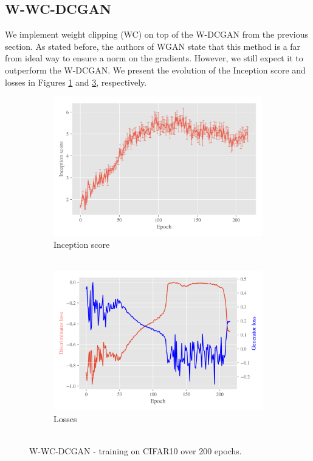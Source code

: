 \subsection{W-WC-DCGAN}
\label{sec:exp-w-wc-dcgan}
We implement weight clipping (WC) on top of the W-DCGAN from the previous section. As stated before, the authors of WGAN state that this method is a far from ideal way to ensure a norm on the gradients. However, we still expect it to outperform the W-DCGAN. We present the evolution of the Inception score and losses in Figures \ref{fig:exp-w-wc-dcgan-is} and \ref{fig:exp-w-wc-dcgan-losses}, respectively. %
\begin{figure}[H]
    \centering
    \begin{subfigure}[t]{0.49\textwidth}
        \centering
		\includegraphics[width=\textwidth]{../code/results/figures/w-wc-dcgan_cifar10_is.png}
		\caption{Inception score\\~}
		\label{fig:exp-w-wc-dcgan-is}
    \end{subfigure}
    \begin{subfigure}[t]{0.49\textwidth}
        \centering
        \includegraphics[width=\textwidth]{../code/results/figures/w-wc-dcgan_cifar10_losses.png}
		\caption{Losses\\~}
		\label{fig:exp-w-wc-dcgan-losses}
    \end{subfigure}
    \caption{W-WC-DCGAN - training on CIFAR10 over 200 epochs.}
\end{figure}%

